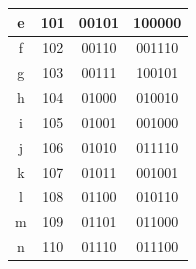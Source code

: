 \documentclass[%
    corpo=11pt,
    twoside,
    stile=classica,
    oldstyle,
    autoretitolo,
    tipotesi=magistrale,
    greek,
    evenboxes,
    english
]{toptesi}
\begin{document}
\begin{table}[]
\begin{tabular}{|c|c|c|c|}
e             & 101                                                           & 00101                                                                        & 100000                                                                       \\ \hline
f             & 102                                                           & 00110                                                                        & 001110                                                                       \\ \hline
g             & 103                                                           & 00111                                                                        & 100101                                                                       \\ \hline
h             & 104                                                           & 01000                                                                        & 010010                                                                       \\ \hline
i             & 105                                                           & 01001                                                                        & 001000                                                                       \\ \hline
j             & 106                                                           & 01010                                                                        & 011110                                                                       \\ \hline
k             & 107                                                           & 01011                                                                        & 001001                                                                       \\ \hline
l             & 108                                                           & 01100                                                                        & 010110                                                                       \\ \hline
m             & 109                                                           & 01101                                                                        & 011000                                                                       \\ \hline
n             & 110                                                           & 01110                                                                        & 011100                                                                       \\ \hline

\end{tabular}
\end{table}
\end{document}
